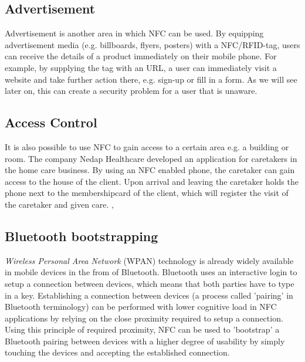 
\subsection{Advertisement}
Advertisement is another area in which NFC can be used. By equipping advertisement media (e.g. billboards, flyers, posters) with a NFC/RFID-tag, users can receive the details of a product immediately on their mobile phone.
For example, by supplying the tag with an URL, a user can immediately visit a website and take further action there, e.g. sign-up or fill in a form.
As we will see later on, this can create a security problem for a user that is unaware. \cite{mulliner2009vulnerability}

\subsection{Access Control}
It is also possible to use NFC to gain access to a certain area e.g. a building or room. The company Nedap Healthcare developed an application for caretakers in the home care business. By using an NFC enabled phone, the caretaker can gain access to the house of the client. Upon arrival and leaving the caretaker holds the phone next to the membershipcard of the client, which will register the visit of the caretaker and given care. \cite{Nedap1}, \cite{Nedap2}

\subsection{Bluetooth bootstrapping}
\textit{Wireless Personal Area Network} (WPAN) technology is already widely available in mobile devices in the from of Bluetooth.
Bluetooth uses an interactive login to setup a connection between devices, which means that both parties have to type in a key.
Establishing a connection between devices (a process called 'pairing' in Bluetooth terminology) can be performed with lower cognitive load in NFC applications by relying on the close proximity required to setup a connection.
Using this principle of required proximity, NFC can be used to 'bootstrap' a Bluetooth pairing between devices with a higher degree of usability by simply touching the devices and accepting the established connection.

